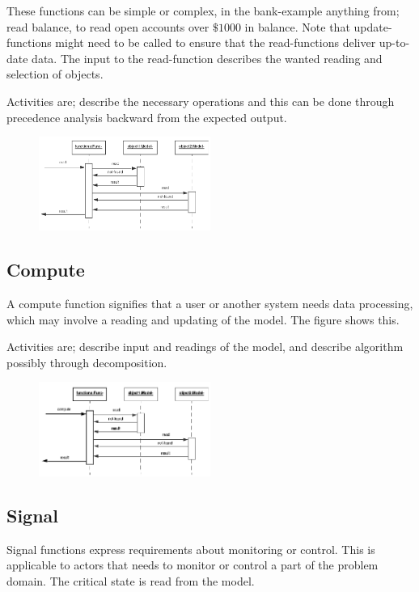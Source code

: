 These functions can be simple or complex, in the bank-example anything from; read balance, to read open accounts over $\$1000$ in balance. Note that update-functions might need to be called to ensure that the read-functions deliver up-to-date data.
The input to the read-function describes the wanted reading and selection of objects.

Activities are; describe the necessary operations and this can be done through precedence analysis backward from the expected output.

\begin{figure}[H]
    \centering
    \includegraphics[width=0.5\textwidth]{figures/functioncomponentread.png}
\end{figure}

\subsection{Compute}
A compute function signifies that a user or another system needs data processing, which may involve a reading and updating of the model. The figure shows this.

Activities are; describe input and readings of the model, and describe algorithm possibly through decomposition.

\begin{figure}[H]
    \centering
    \includegraphics[width=0.5\textwidth]{figures/functioncomponentcompute.png}
\end{figure}

\subsection{Signal}
Signal functions express requirements about monitoring or control. This is applicable to actors that needs to monitor or control a part of the problem domain. The critical state is read from the model.

